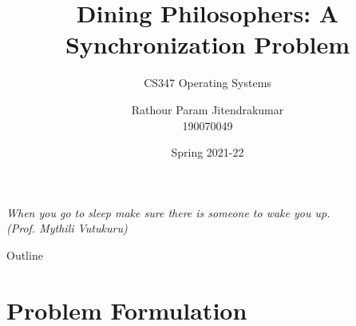 \documentclass[aspectratio=169, handout, 10pt]{beamer}
\title[Dining Philosophers]{Dining Philosophers: A Synchronization Problem}
\subtitle{CS347 Operating Systems}
\author[Param]{Rathour Param Jitendrakumar\\190070049}
\institute[IIT Bombay]{Department of Electrical Engineering\\
Indian Institue of Technology Bombay} %
\date{Spring 2021-22}
\theoremstyle{example}
\begin{document}
\begin{frame}
  \titlepage
  \begin{center}
      \it When you go to sleep make sure there is someone to wake you up.\\
      \hfill{(Prof. Mythili Vutukuru)}
  \end{center}
\end{frame}

\begin{frame}{Outline}
  \tableofcontents
\end{frame}

\section{Problem Formulation}
\end{document}

